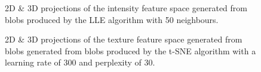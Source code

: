 \begin{figure}[H]
	\centering
	\caption{2D \& 3D projections of the intensity feature space generated from blobs produced by the LLE algorithm with 50 neighbours.}\label{fig:intensity_LLE_mapping}
\end{figure}
\clearpage

\clearpage
\begin{figure}[H]
	\centering
	\caption{2D \& 3D projections of the texture feature space generated from blobs generated from blobs produced by the t-SNE algorithm with a learning rate of 300 and perplexity of 30.}\label{fig:texture_SNE_mapping}
\end{figure}

